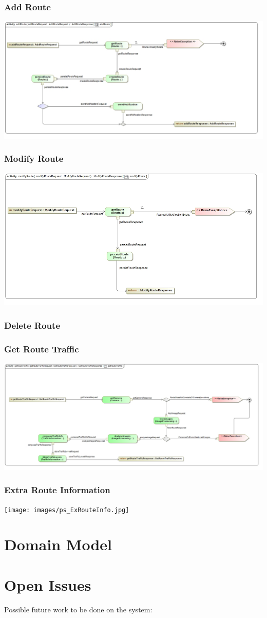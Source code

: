\documentclass[a4paper,12pt]{article}
\begin{document}
\subsubsection{Add Route}
\includegraphics[width=\textwidth]{images/psAdd_Route.jpg}
\subsubsection{Modify Route}
\includegraphics[width=\textwidth]{images/psModify_Route.jpg} 
\subsubsection{Delete Route}
\subsubsection{Get Route Traffic}
\includegraphics[width=\textwidth]{images/ps_GetRouteTraffic.jpg}
\subsubsection{Extra Route Information}
\texttt{[image: images/ps\_ExRouteInfo.jpg]}
\section{Domain Model}

\section{Open Issues}
Possible future work to be done on the system:
\begin{itemize}

\end{itemize}
\end{document}
